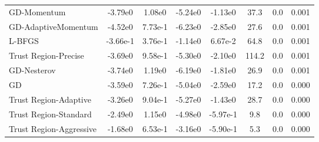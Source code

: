 \documentclass{article}
\begin{document}
\begin{table}[htbp]
{\begin{tabular}{p{2.5cm}*{7}{c}}
GD-Momentum & -3.79e0 & 1.08e0 & -5.24e0 & -1.13e0 & 37.3 & 0.0 & 0.001 \\
GD-AdaptiveMomentum & -4.52e0 & 7.73e-1 & -6.23e0 & -2.85e0 & 27.6 & 0.0 & 0.001 \\
L-BFGS & -3.66e-1 & 3.76e-1 & -1.14e0 & 6.67e-2 & 64.8 & 0.0 & 0.001 \\
Trust Region-Precise & -3.69e0 & 9.58e-1 & -5.30e0 & -2.10e0 & 114.2 & 0.0 & 0.001 \\
GD-Nesterov & -3.74e0 & 1.19e0 & -6.19e0 & -1.81e0 & 26.9 & 0.0 & 0.001 \\
GD & -3.59e0 & 7.26e-1 & -5.04e0 & -2.59e0 & 17.2 & 0.0 & 0.000 \\
Trust Region-Adaptive & -3.26e0 & 9.04e-1 & -5.27e0 & -1.43e0 & 28.7 & 0.0 & 0.000 \\
Trust Region-Standard & -2.49e0 & 1.15e0 & -4.98e0 & -5.97e-1 & 9.8 & 0.0 & 0.000 \\
Trust Region-Aggressive & -1.68e0 & 6.53e-1 & -3.16e0 & -5.90e-1 & 5.3 & 0.0 & 0.000 \\
\bottomrule
\end{tabular}
}
\end{table}
\end{document}
